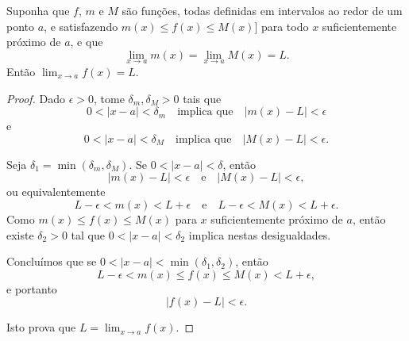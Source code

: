 \begin{theorem}
	Suponha que $f$, $m$ e $M$ são funções, todas definidas em intervalos ao redor de um ponto $a$, e satisfazendo
	\(m(x)\leq f(x)\leq M(x)\)]
	para todo $x$ suficientemente próximo de $a$, e que
	\[\lim_{x\to a}m(x)=\lim_{x\to a}M(x)=L.\]
	Então $\lim_{x\to a}f(x)=L$.
\end{theorem}

\begin{proof}
	Dado $\epsilon>0$, tome $\delta_m,\delta_M>0$ tais que
	\[0<|x-a|<\delta_m\quad\text{implica que}\quad |m(x)-L|<\epsilon\]
	e
	\[0<|x-a|<\delta_M\quad \text{implica que}\quad |M(x)-L|<\epsilon.\]
	
	Seja $\delta_1=\min(\delta_m,\delta_M)$. Se $0<|x-a|<\delta$, então
	\[|m(x)-L|<\epsilon\quad\text{e}\quad|M(x)-L|<\epsilon,\]
	ou equivalentemente
	\[L-\epsilon < m(x) < L+\epsilon\quad\text{e}\quad L-\epsilon < M(x) < L+\epsilon.\]
	Como $m(x)\leq f(x)\leq M(x)$ para $x$ suficientemente próximo de $a$, então existe $\delta_2>0$ tal que $0<|x-a|<\delta_2$ implica nestas desigualdades.
	
	Concluímos que se $0<|x-a|<\min(\delta_1,\delta_2)$, então
	\[L-\epsilon < m(x)\leq f(x)\leq M(x) < L+\epsilon,\]
	e portanto
	\[|f(x)-L|<\epsilon.\]
	
	Isto prova que $L=\lim_{x\to a}f(x)$.
\end{proof}